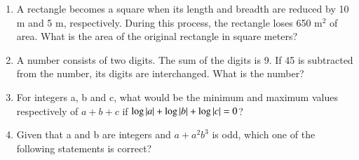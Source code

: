 \documentclass[a4paper,10pt]{article}
\begin{document}
\begin{enumerate}
    \item A rectangle becomes a square when its length and breadth are reduced by 10 m and 5 m, respectively. During this process, the rectangle loses 650 m$^2$ of area. What is the area of the original rectangle in square meters?
    \hfill{}
    \begin{enumerate}[label=\Alph*)]
    \end{enumerate}

    \item A number consists of two digits. The sum of the digits is 9. If 45 is subtracted from the number, its digits are interchanged. What is the number?
    \hfill{}
    \begin{enumerate}[label=\Alph*)]
    \end{enumerate}

    \item For integers a, b and c, what would be the minimum and maximum values respectively of $a + b + c$ if $\log \left\vert a\right\vert + \log \left\vert b\right\vert + \log \left\vert c\right\vert = 0$?
    \hfill{}
    \begin{enumerate}[label=\Alph*)]
    \end{enumerate}

    \item Given that a and b are integers and $a + a^2 b^3$ is odd, which one of the following statements is correct?
    \hfill{}
    \begin{enumerate}[label=\Alph*)]
    \end{enumerate}


\end{enumerate}
\end{document}
